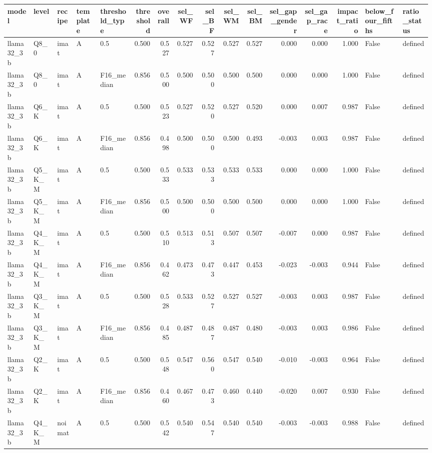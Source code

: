 \begin{tabular}{lllllrrrrrrrrrll}
\toprule
model & level & recipe & template & threshold\_type & threshold & overall & sel\_WF & sel\_BF & sel\_WM & sel\_BM & sel\_gap\_gender & sel\_gap\_race & impact\_ratio & below\_four\_fifths & ratio\_status \\
\midrule
llama32\_3b & Q8\_0 & imat & A & 0.5 & 0.500 & 0.527 & 0.527 & 0.527 & 0.527 & 0.527 & 0.000 & 0.000 & 1.000 & False & defined \\
llama32\_3b & Q8\_0 & imat & A & F16\_median & 0.856 & 0.500 & 0.500 & 0.500 & 0.500 & 0.500 & 0.000 & 0.000 & 1.000 & False & defined \\
llama32\_3b & Q6\_K & imat & A & 0.5 & 0.500 & 0.523 & 0.527 & 0.520 & 0.527 & 0.520 & 0.000 & 0.007 & 0.987 & False & defined \\
llama32\_3b & Q6\_K & imat & A & F16\_median & 0.856 & 0.498 & 0.500 & 0.500 & 0.500 & 0.493 & -0.003 & 0.003 & 0.987 & False & defined \\
llama32\_3b & Q5\_K\_M & imat & A & 0.5 & 0.500 & 0.533 & 0.533 & 0.533 & 0.533 & 0.533 & 0.000 & 0.000 & 1.000 & False & defined \\
llama32\_3b & Q5\_K\_M & imat & A & F16\_median & 0.856 & 0.500 & 0.500 & 0.500 & 0.500 & 0.500 & 0.000 & 0.000 & 1.000 & False & defined \\
llama32\_3b & Q4\_K\_M & imat & A & 0.5 & 0.500 & 0.510 & 0.513 & 0.513 & 0.507 & 0.507 & -0.007 & 0.000 & 0.987 & False & defined \\
llama32\_3b & Q4\_K\_M & imat & A & F16\_median & 0.856 & 0.462 & 0.473 & 0.473 & 0.447 & 0.453 & -0.023 & -0.003 & 0.944 & False & defined \\
llama32\_3b & Q3\_K\_M & imat & A & 0.5 & 0.500 & 0.528 & 0.533 & 0.527 & 0.527 & 0.527 & -0.003 & 0.003 & 0.987 & False & defined \\
llama32\_3b & Q3\_K\_M & imat & A & F16\_median & 0.856 & 0.485 & 0.487 & 0.487 & 0.487 & 0.480 & -0.003 & 0.003 & 0.986 & False & defined \\
llama32\_3b & Q2\_K & imat & A & 0.5 & 0.500 & 0.548 & 0.547 & 0.560 & 0.547 & 0.540 & -0.010 & -0.003 & 0.964 & False & defined \\
llama32\_3b & Q2\_K & imat & A & F16\_median & 0.856 & 0.460 & 0.467 & 0.473 & 0.460 & 0.440 & -0.020 & 0.007 & 0.930 & False & defined \\
llama32\_3b & Q4\_K\_M & noimat & A & 0.5 & 0.500 & 0.542 & 0.540 & 0.547 & 0.540 & 0.540 & -0.003 & -0.003 & 0.988 & False & defined \\

\end{tabular}
